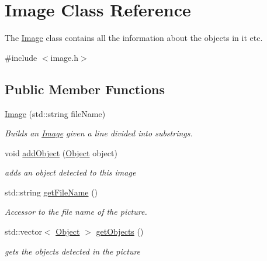 \hypertarget{class_image}{}\section{Image Class Reference}
\label{class_image}


The \hyperlink{class_image}{Image} class contains all the information about the objects in it etc.  




{\ttfamily \#include $<$image.\+h$>$}

\subsection*{Public Member Functions}
\begin{DoxyCompactItemize}
\item 
\hyperlink{class_image_a02455aeac6921a752aee20d1697ca162}{Image} (std\+::string file\+Name)
\begin{DoxyCompactList}\small\item\em Builds an \hyperlink{class_image}{Image} given a line divided into substrings. \end{DoxyCompactList}\item 
void \hyperlink{class_image_a6f2d732f8c5c253a511d6bbbdaf6d64a}{add\+Object} (\hyperlink{class_object}{Object} object)
\begin{DoxyCompactList}\small\item\em adds an object detected to this image \end{DoxyCompactList}\item 
std\+::string \hyperlink{class_image_a6546fe9d1f1b8bd456370a64816d1e5f}{get\+File\+Name} ()
\begin{DoxyCompactList}\small\item\em Accessor to the file name of the picture. \end{DoxyCompactList}\item 
std\+::vector$<$ \hyperlink{class_object}{Object} $>$ \hyperlink{class_image_a4a981047292f47239383d6bbcd946b4d}{get\+Objects} ()\hypertarget{class_image_a4a981047292f47239383d6bbcd946b4d}{}\label{class_image_a4a981047292f47239383d6bbcd946b4d}

\begin{DoxyCompactList}\small\item\em gets the objects detected in the picture \end{DoxyCompactList}\end{DoxyCompactItemize}


